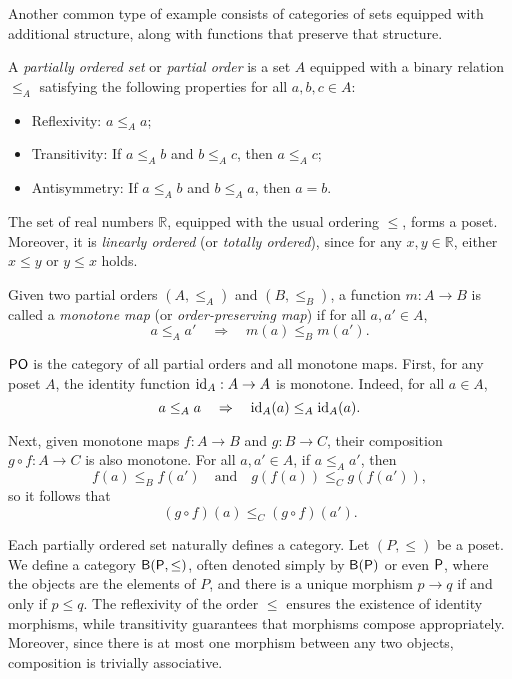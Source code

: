 Another common type of example consists of categories of sets equipped with additional structure, along with functions that preserve that structure.


\begin{definition}
A \emph{partially ordered set} or \emph{partial order} is a set $A$ equipped with a binary relation $\leq_A$ satisfying the following properties for all $a, b, c \in A$:
\begin{itemize}
    \item Reflexivity: $a \leq_A a$;
    \item Transitivity: If $a \leq_A b$ and $b \leq_A c$, then $a \leq_A c$;
    \item Antisymmetry: If $a \leq_A b$ and $b \leq_A a$, then $a = b$.
\end{itemize}
\end{definition}

\begin{example}
The set of real numbers \(\mathbb{R}\), equipped with the usual ordering \(\leq\), forms a poset. Moreover, it is \emph{linearly ordered} (or \emph{totally ordered}), since for any \(x, y \in \mathbb{R}\), either \(x \leq y\) or \(y \leq x\) holds.
\end{example}

\begin{definition}
Given two partial orders \((A, \leq_A)\) and \((B,\leq_B)\), a function \(m: A \to B\) is called a \emph{monotone map} (or \emph{order-preserving map}) if for all \(a, a' \in A\),
\[
a \leq_A a' \quad \Rightarrow \quad m(a) \leq_B m(a').
\]
\end{definition}



\begin{example}
  $\mathsf{PO}$ is the category of all partial orders and all monotone maps. First, for any poset \(A\), the identity function \(\mathrm{id}_A : A \to A\) is monotone. Indeed, for all \(a \in A\),
\[
a \leq_A a \quad \Rightarrow \quad \mathrm{id}_A(a) \leq_A \mathrm{id}_A(a).
\]

Next, given monotone maps \(f : A \to B\) and \(g : B \to C\), their composition \(g \circ f : A \to C\) is also monotone. For all \(a, a' \in A\), if \(a \leq_A a'\), then
\[
f(a) \leq_B f(a') \quad \text{and} \quad g(f(a)) \leq_C g(f(a')),
\]
so it follows that
\[
(g \circ f)(a) \leq_C (g \circ f)(a').
\]

\end{example}

\begin{example}
  Each partially ordered set naturally defines a category. Let \( (P, \leq) \) be a poset. We define a category \( \mathsf{B(P, \leq)} \), often denoted simply by \( \mathsf{B(P)} \) or even \( \mathsf{P} \), where the objects are the elements of \( P \), and there is a unique morphism \( p \to q \) if and only if \( p \leq q \). The reflexivity of the order \( \leq \) ensures the existence of identity morphisms, while transitivity guarantees that morphisms compose appropriately. Moreover, since there is at most one morphism between any two objects, composition is trivially associative. 
\end{example}

